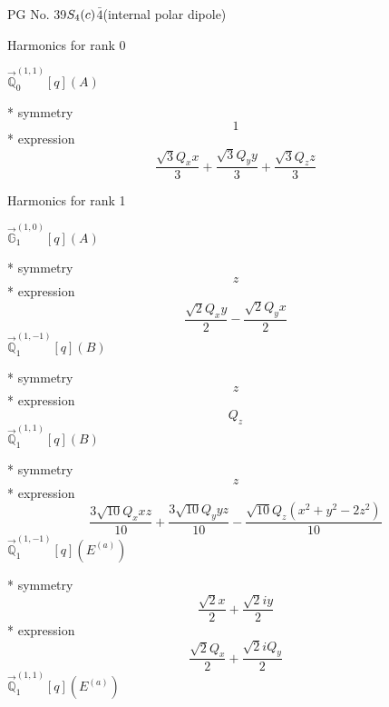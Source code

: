 \documentclass[fleqn,8pt]{jsarticle}
\begin{document}
\setcounter{MaxMatrixCols}{32}

\renewcommand{\tablename}{Table~}
\renewcommand{\figurename}{Figure~}
\begin{center}
\LARGE
PG No. 39\quad$S_{\rm 4}(c)$\quad$\bar{4}$\quad[ tetragonal ] (internal polar dipole)
\end{center}

\noindent * Harmonics for rank 0

\noindent\quad $\vec{\mathbb{Q}}_{0}^{(1,1)}[q](A)$

\noindent\quad ** symmetry
\begin{dmath*}
1
\end{dmath*}
\noindent\quad ** expression
\begin{dmath*}
\frac{\sqrt{3} Q_{x} x}{3} + \frac{\sqrt{3} Q_{y} y}{3} + \frac{\sqrt{3} Q_{z} z}{3}
\end{dmath*}

\noindent * Harmonics for rank 1

\noindent\quad $\vec{\mathbb{G}}_{1}^{(1,0)}[q](A)$

\noindent\quad ** symmetry
\begin{dmath*}
z
\end{dmath*}
\noindent\quad ** expression
\begin{dmath*}
\frac{\sqrt{2} Q_{x} y}{2} - \frac{\sqrt{2} Q_{y} x}{2}
\end{dmath*}
\noindent\quad $\vec{\mathbb{Q}}_{1}^{(1,-1)}[q](B)$

\noindent\quad ** symmetry
\begin{dmath*}
z
\end{dmath*}
\noindent\quad ** expression
\begin{dmath*}
Q_{z}
\end{dmath*}
\noindent\quad $\vec{\mathbb{Q}}_{1}^{(1,1)}[q](B)$

\noindent\quad ** symmetry
\begin{dmath*}
z
\end{dmath*}
\noindent\quad ** expression
\begin{dmath*}
\frac{3 \sqrt{10} Q_{x} x z}{10} + \frac{3 \sqrt{10} Q_{y} y z}{10} - \frac{\sqrt{10} Q_{z} \left(x^{2} + y^{2} - 2 z^{2}\right)}{10}
\end{dmath*}
\noindent\quad $\vec{\mathbb{Q}}_{1}^{(1,-1)}[q](E^{(a)})$

\noindent\quad ** symmetry
\begin{dmath*}
\frac{\sqrt{2} x}{2} + \frac{\sqrt{2} i y}{2}
\end{dmath*}
\noindent\quad ** expression
\begin{dmath*}
\frac{\sqrt{2} Q_{x}}{2} + \frac{\sqrt{2} i Q_{y}}{2}
\end{dmath*}
\noindent\quad $\vec{\mathbb{Q}}_{1}^{(1,1)}[q](E^{(a)})$
\end{document}

